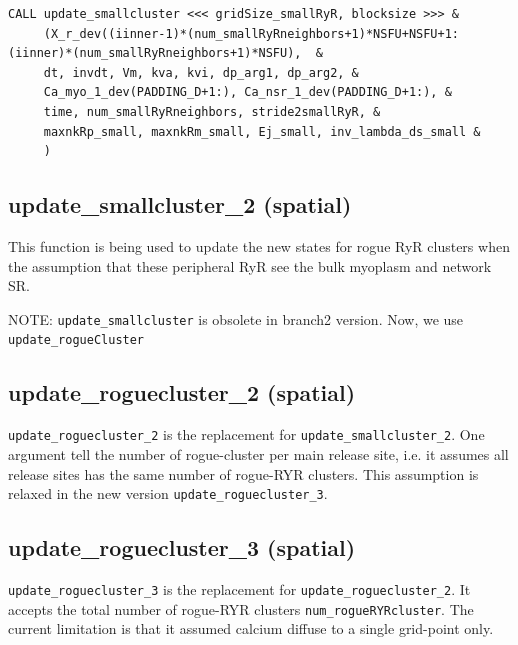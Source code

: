 \begin{verbatim}
CALL update_smallcluster <<< gridSize_smallRyR, blocksize >>> &
     (X_r_dev((iinner-1)*(num_smallRyRneighbors+1)*NSFU+NSFU+1:(iinner)*(num_smallRyRneighbors+1)*NSFU),  &
     dt, invdt, Vm, kva, kvi, dp_arg1, dp_arg2, &
     Ca_myo_1_dev(PADDING_D+1:), Ca_nsr_1_dev(PADDING_D+1:), &
     time, num_smallRyRneighbors, stride2smallRyR, &
     maxnkRp_small, maxnkRm_small, Ej_small, inv_lambda_ds_small &
     )
\end{verbatim}

\subsection{update\_smallcluster\_2 (spatial)}
\label{sec:update_smallcluster}

This function is being used to update the new states for rogue RyR clusters
when the assumption that these peripheral RyR see the bulk myoplasm and network
SR.

\begin{framed}
NOTE: \verb!update_smallcluster! is obsolete in branch2 version. Now, we use
\verb!update_rogueCluster!
\end{framed}

\subsection{update\_roguecluster\_2 (spatial)}

\verb!update_roguecluster_2! is the replacement for
\verb!update_smallcluster_2!. One argument tell the number of rogue-cluster per
main release site, i.e. it assumes all release sites has the same number of
rogue-RYR clusters. This assumption is relaxed in the new version
\verb!update_roguecluster_3!.

\subsection{update\_roguecluster\_3 (spatial)}

\verb!update_roguecluster_3! is the replacement for
\verb!update_roguecluster_2!. It accepts the total number of rogue-RYR clusters
\verb!num_rogueRYRcluster!. The current limitation is that it assumed calcium
diffuse to a single grid-point only.

